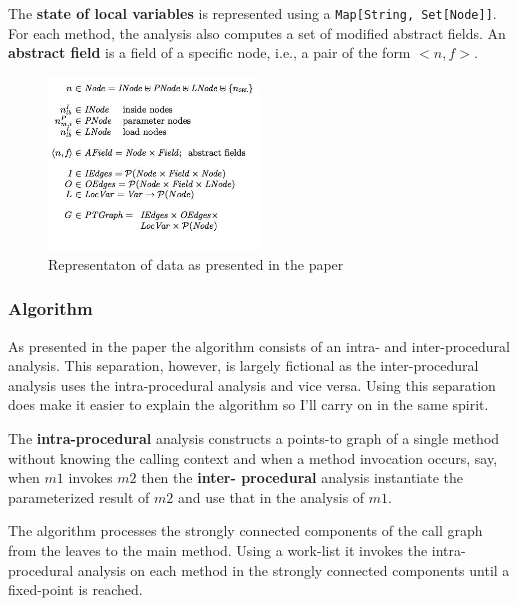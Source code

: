 \documentclass[11pt]{exam}
\begin{document}
The \textbf{state of local variables} is represented using a
\texttt{Map[String, Set[Node]]}. For each method, the analysis also
computes a set of modified abstract fields. An \textbf{abstract field}
is a field of a specific node, i.e., a pair of the form $<n,f>$.

\begin{figure}[h!]
\begin{center}
  \includegraphics[width=0.5\textwidth]{data-representation}
\end{center}
\caption{Representaton of data as presented in the paper}
\label{data-notation}
\end{figure}

\subsubsection*{Algorithm}

As presented in the paper the algorithm consists of an intra- and
inter-procedural analysis. This separation, however, is largely
fictional as the inter-procedural analysis uses the intra-procedural
analysis and vice versa. Using this separation does make it easier to
explain the algorithm so I'll carry on in the same spirit. \newline

The \textbf{intra-procedural} analysis constructs a points-to graph of
a single method without knowing the calling context and  when a method
invocation occurs, say, when $m1$ invokes $m2$ then the \textbf{inter-
procedural} analysis instantiate the  parameterized result of $m2$ and
use that in the analysis of $m1$. \newline

The algorithm processes the strongly connected components of the call
graph from the leaves to the main method. Using a work-list it invokes
the  intra-procedural analysis on each method in the strongly
connected components until a fixed-point is reached. \newline
\end{document}
